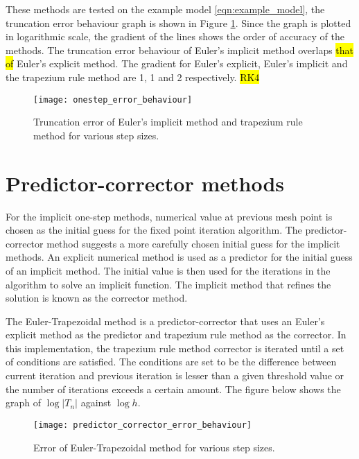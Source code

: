 These methods are tested on the example model \ref{eqn:example_model}, the truncation error behaviour graph is shown in Figure \ref{fig:onestep_error_behaviour}. Since the graph is plotted in logarithmic scale, the gradient of the lines shows the order of accuracy of the methods. The truncation error behaviour of Euler's implicit method overlaps \hl{that of} Euler's explicit method. The gradient for Euler's explicit, Euler's implicit and the trapezium rule method are 1, 1 and 2 respectively. \hl{RK4}

\begin{figure}
    \texttt{[image: onestep\_error\_behaviour]}
    \caption{Truncation error of Euler's implicit method and trapezium rule method for various step sizes.}
    \label{fig:onestep_error_behaviour}
\end{figure}

\section{Predictor-corrector methods}
\label{sec:predictor-corrector}
For the implicit one-step methods, numerical value at previous mesh point is chosen as the initial guess for the fixed point iteration algorithm. The predictor-corrector method suggests a more carefully chosen initial guess for the implicit methods. An explicit numerical method is used as a predictor for the initial guess of an implicit method. The initial value is then used for the iterations in the algorithm to solve an implicit function. The implicit method that refines the solution is known as the corrector method. 

The Euler-Trapezoidal method is a predictor-corrector that uses an Euler's explicit method as the predictor and trapezium rule method as the corrector. In this implementation, the trapezium rule method corrector is iterated until a set of conditions are satisfied. The conditions are set to be the difference between current iteration and previous iteration is lesser than a given threshold value or the number of iterations exceeds a certain amount. The figure below shows the graph of $\log |T_n|$ against $\log h$.

\begin{figure}
    \texttt{[image: predictor\_corrector\_error\_behaviour]}
    \caption{Error of Euler-Trapezoidal method for various step sizes.}
    \label{fig:predictor_corrector_error_behaviour}
\end{figure}

